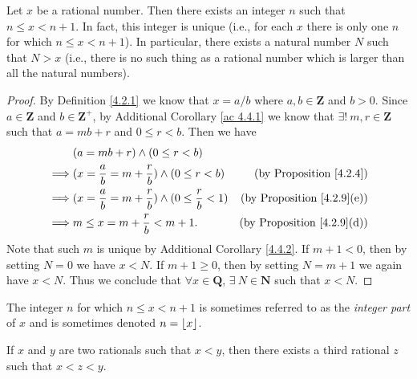 \begin{proposition}\label{4.4.1}
    Let \(x\) be a rational number.
    Then there exists an integer \(n\) such that \(n \leq x < n + 1\).
    In fact, this integer is unique (i.e., for each \(x\) there is only one \(n\) for which \(n \leq x < n + 1\)).
    In particular, there exists a natural number \(N\) such that \(N > x\)
    (i.e., there is no such thing as a rational number which is larger than all the natural numbers).
\end{proposition}

\begin{proof}
    By Definition \ref{4.2.1} we know that \(x = a / b\) where \(a, b \in \mathbf{Z}\) and \(b > 0\).
    Since \(a \in \mathbf{Z}\) and \(b \in \mathbf{Z}^+\), by Additional Corollary \ref{ac 4.4.1} we know that \(\exists!\ m, r \in \mathbf{Z}\) such that \(a = mb + r\) and \(0 \leq r < b\).
    Then we have
    \begin{align*}
                 & (a = mb + r) \land (0 \leq r < b)                                                                           \\
        \implies & (x = \frac{a}{b} = m + \frac{r}{b}) \land (0 \leq r < b)           & \text{(by Proposition \ref{4.2.4})}    \\
        \implies & (x = \frac{a}{b} = m + \frac{r}{b}) \land (0 \leq \frac{r}{b} < 1) & \text{(by Proposition \ref{4.2.9}(e))} \\
        \implies & m \leq x = m + \frac{r}{b} < m + 1.                                & \text{(by Proposition \ref{4.2.9}(d))}
    \end{align*}
    Note that such \(m\) is unique by Additional Corollary \ref{4.4.2}.
    If \(m + 1 < 0\), then by setting \(N = 0\) we have \(x < N\).
    If \(m + 1 \geq 0\), then by setting \(N = m + 1\) we again have \(x < N\).
    Thus we conclude that \(\forall x \in \mathbf{Q}\), \(\exists\ N \in \mathbf{N}\) such that \(x < N\).
\end{proof}

\begin{remark}\label{4.4.2}
    The integer \(n\) for which \(n \leq x < n + 1\) is sometimes referred to as the \emph{integer part} of \(x\) and is sometimes denoted \(n = \floor*{x}\).
\end{remark}

\begin{proposition}\label{4.4.3}
    If \(x\) and \(y\) are two rationals such that \(x < y\), then there exists a third rational \(z\) such that \(x < z < y\).
\end{proposition}

